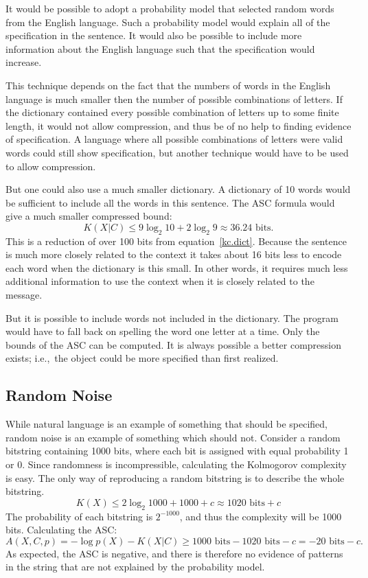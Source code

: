 It would be possible to adopt a probability model that selected random words from the English language.
Such a probability model would explain all of the specification in the sentence.
It would also be possible to include more information about the English language such that the specification would increase.

This technique depends on the fact that the numbers of words in the English language is much smaller then the number of possible combinations of letters.
If the dictionary contained every possible combination of letters up to some finite length, it would not allow compression, and thus be of no help to finding evidence of specification.
A language where all possible combinations of letters were valid words could still show specification, but another technique would have to be used to allow compression.

But one could also use a much smaller dictionary.
A dictionary of 10 words would be sufficient to include all the words in this sentence.
The ASC formula would give a much smaller compressed bound:
\begin{equation}
    K(X|C) \leq 9 \log_2 10 + 2 \log_2 9 \approx 36.24 \mbox{ bits.}
\end{equation}
This is a reduction of over 100 bits from equation~\ref{kc.dict}.
Because the sentence is much more closely related to the context
it takes about 16 bits less to encode each word when the dictionary is this small.
In other words, it requires much less additional information to use the context when it is closely related to the message.

But it is possible to include words not included in the dictionary.
The program would have to fall back on spelling the word one letter at a time.
Only the bounds of the ASC can be computed.
It is always possible a better compression exists; i.e.,\ the object could be more specified than first realized.

\subsection{Random Noise}
While natural language is an example of something that should be specified, random noise is an example of something which should not.
Consider a random bitstring containing 1000 bits, where each bit is assigned with equal probability 1 or 0.
Since randomness is incompressible, calculating the Kolmogorov complexity is easy.
The only way of reproducing a random bitstring is to describe the whole bitstring.
\begin{equation}
    K(X) \leq 2 \log_2 1000 + 1000 + c \approx 1020 \mbox{ bits} + c
\end{equation}
The probability of each bitstring is $2^{-1000}$, and thus the complexity will be 1000 bits.
Calculating the ASC:
\begin{equation}
    A(X,C,p) = - \log p(X) - K(X|C) \geq 1000 \mbox{ bits} - 1020 \mbox{ bits} - c = -20 \mbox{ bits} - c \mbox{.}
\end{equation}
As expected, the ASC is negative, and there is therefore no evidence of patterns in the string that are not explained by the probability model.

